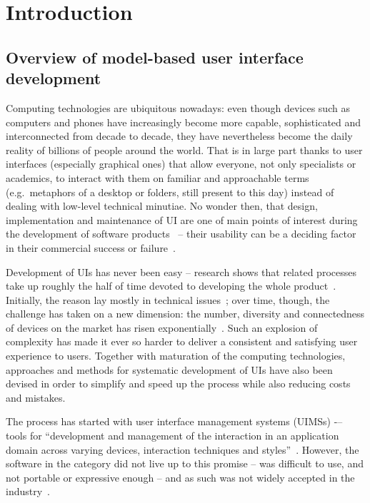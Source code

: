 \chapter{Introduction}\label{ch:introduction}

\section{Overview of model-based user interface development}\label{sec:user-interfaces-are-important}
Computing technologies are ubiquitous nowadays: even though devices such as computers and phones have increasingly become more capable, sophisticated and interconnected from decade to decade, they have nevertheless become the daily reality of billions of people around the world.
That is in large part thanks to user interfaces (especially graphical ones) that allow everyone, not only specialists or academics, to interact with them on familiar and approachable terms (e.g.\ metaphors of a desktop or folders, still present to this day) instead of dealing with low-level technical minutiae.
No wonder then, that design, implementation and maintenance of UI are one of main points of interest during the development of software products~\cite{Anderson2010} -- their usability can be a deciding factor in their commercial success or failure~\cite{Offutt2002}.

Development of UIs has never been easy -- research shows that related processes take up roughly the half of time devoted to developing the whole product~\cite{Myers1992}.
Initially, the reason lay mostly in technical issues~\cite{Six1991};
over time, though, the challenge has taken on a new dimension:
the number, diversity and connectedness of devices on the market has risen exponentially~\cite{Cisco2020}.
Such an explosion of complexity has made it ever so harder to deliver a consistent and satisfying user experience to users.
Together with maturation of the computing technologies, approaches and methods for systematic development of UIs have also been devised in order to simplify and speed up the process while also reducing costs and mistakes.

The process has started with user interface management systems (UIMSs) -– tools for \enquote{development and management of the interaction in an application domain across varying devices, interaction techniques and styles}~\cite{Betts1987}.
However, the software in the category did not live up to this promise -- was difficult to use, and not portable or expressive enough -- and as such was not widely accepted in the industry~\cite{Myers1987}.

